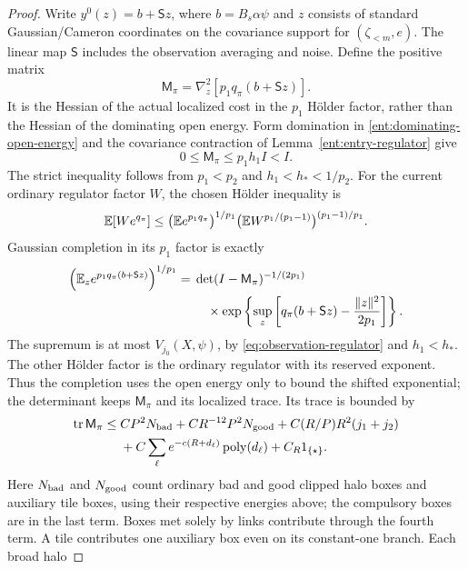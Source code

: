 \begin{proof}
Write \(y^0(z)=b+\mathsf S z\), where \(b=B_s\alpha\psi\) and
\(z\) consists of standard Gaussian/Cameron coordinates on the
covariance support for
\((\zeta_{<m},e)\).  The linear map \(\mathsf S\) includes the
observation averaging and noise.  Define the positive matrix
\[
       \mathsf M_\pi=\nabla_z^2\!\left[p_1q_\pi(b+\mathsf S z)\right].
\]
It is the Hessian of the actual localized cost in the \(p_1\)
H\"older factor, rather than the Hessian of the dominating open
energy.  Form domination in \eqref{ent:dominating-open-energy}
and the covariance contraction of Lemma~\ref{ent:entry-regulator}
give
\[
                 0\le \mathsf M_\pi\le p_1h_1 I<I .
\]
The strict inequality follows from
\(p_1<p_2\) and \(h_1<h_*<1/p_2\).  For the current ordinary
regulator factor \(W\), the chosen H\"older inequality is
\[
 \mathbb E[We^{q_\pi}]
 \le
 \bigl(\mathbb E e^{p_1q_\pi}\bigr)^{1/p_1}
 \bigl(\mathbb E W^{p_1/(p_1-1)}\bigr)^{(p_1-1)/p_1}.
\]
Gaussian completion in its \(p_1\) factor is exactly
\begin{equation}\label{ent:entry-completion}
\begin{split}
 \left(\mathbb E_z e^{p_1q_\pi(b+\mathsf S z)}\right)^{1/p_1}
 ={}&\det(I-\mathsf M_\pi)^{-1/(2p_1)}\\
 &\quad{}\times
 \exp\left\{\sup_z\left[
       q_\pi(b+\mathsf S z)-\frac{\|z\|^2}{2p_1}\right]\right\}.
\end{split}
\end{equation}
The supremum is at most \(V_{j_0}(X,\psi)\), by
\eqref{eq:observation-regulator} and \(h_1<h_*\).  The other
H\"older factor is the ordinary regulator with its reserved
exponent.  Thus the completion uses the open energy only to bound
the shifted exponential; the determinant keeps \(\mathsf M_\pi\) and its
localized trace.
Its trace is bounded by
\begin{equation}\label{ent:entry-trace}
\begin{split}
 \operatorname{tr} \mathsf M_\pi\le {}&
 CP^2 N_{\rm bad}
 +CR^{-12}P^2N_{\rm good}
 +C(R/P)R^2(j_1+j_2)\\
 &+C\sum_\ell e^{-c(R+d_\ell)}
                         \operatorname{poly}(d_\ell)
 +C_R1_{\{\star\}} .
\end{split}
\end{equation}
Here \(N_{\rm bad}\) and \(N_{\rm good}\) count ordinary bad and good
clipped halo boxes and auxiliary tile boxes, using their respective
energies above; the compulsory boxes are in the last term.  Boxes met
solely by links contribute through the fourth term.  A tile contributes
one auxiliary box even on its constant-one branch.  Each broad halo

\end{proof}
